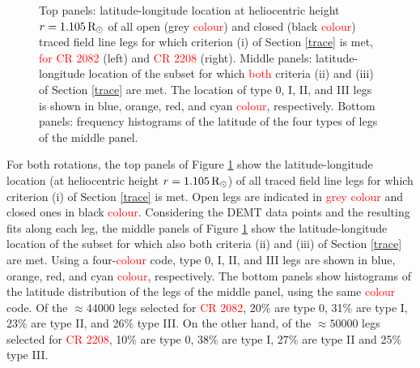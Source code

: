 \documentclass[namedreferences]{solarphysics}
\def\edit#1{\textcolor{Red}{#1}}
\newcommand{\mrsun}{{\rm R_\odot}}
\begin{document}
\begin{article}
\begin{figure}[h!]
\begin{center}
\caption{{Top panels:} {latitude-longitude location at heliocentric height $r=1.105\,\mrsun$ of all open (grey \edit{colour}) and closed (black \edit{colour}) traced field line legs for which criterion (i) of Section \ref{trace} is met, \edit{for} \edit{CR 2082} (left) and \edit{CR 2208} (right). {Middle panels}: latitude-longitude location of the subset for which \edit{both} criteria (ii) and (iii) of Section \ref{trace} are met. {The location of} type 0, I, II, and III legs {is shown} in blue, {orange, red, and cyan} \edit{colour}, respectively.} {Bottom panels: frequency histograms of the latitude of the four types of legs of the middle panel.}}
\label{rpoint_demt}
\end{center}
\end{figure}

For both rotations, the top panels of Figure \ref{rpoint_demt} show the latitude-longitude location (at heliocentric height $r=1.105\,\mrsun$) of all traced field line legs for which criterion (i) of Section \ref{trace} is met. Open legs are indicated in \edit{grey} \edit{colour} and closed ones in black \edit{colour}. Considering the DEMT data points and the resulting fits along each leg, the {middle} panels of Figure \ref{rpoint_demt} show the latitude-longitude location of the subset for which also both criteria (ii) and (iii) of Section \ref{trace} are met. Using a four-\edit{colour} code, type 0, I, II, and III legs are shown in blue, {orange, red, and cyan} \edit{colour}, respectively. {The bottom panels show histograms of the latitude distribution of the legs of the middle panel, using the same \edit{colour} code.} Of the {$\approx 44000$} legs selected for \edit{CR 2082}, 20\% are type 0, 31\% are type I, 23\% are type II, and 26\% type III. On the other hand, of the {$\approx 50000$} legs selected for \edit{CR 2208}, 10\% are type 0, {38}\% are type I, {27}\% are type II and {25}\% type III.


\end{article}
\end{document}
